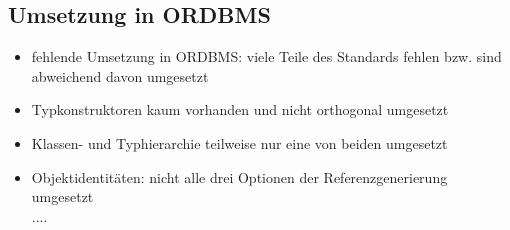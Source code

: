 \newpage
\subsection{Umsetzung in ORDBMS}
\begin{itemize}
	\item fehlende Umsetzung in ORDBMS: viele Teile des Standards fehlen bzw. sind abweichend davon umgesetzt
	\item Typkonstruktoren kaum vorhanden und nicht orthogonal umgesetzt
	\item Klassen- und Typhierarchie teilweise nur eine von beiden umgesetzt
	\item Objektidentitäten: nicht alle drei Optionen der Referenzgenerierung umgesetzt\\
	....
\end{itemize}


